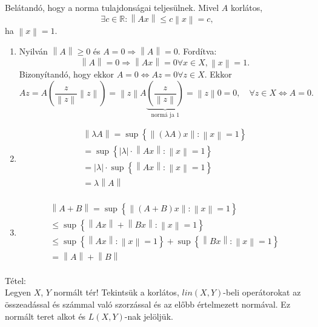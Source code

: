 \documentclass[12pt,a4paper]{scrartcl}
\providecommand{\tightlist}{%
  \setlength{\itemsep}{0pt}\setlength{\parskip}{0pt}}
\newenvironment{tetel}{}{}
\begin{document}
Belátandó, hogy a norma tulajdonságai teljesülnek. Mivel \(A\) korlátos,
\[\exists c \in {\mathbb{R}}:\left\| {Ax} \right\| \leq c\left\| x \right\| = c,\]
ha \(\left\| x \right\| = 1\).

\begin{enumerate}
\def\labelenumi{\arabic{enumi}.}
\tightlist
\item
  Nyilván \(\left\| A \right\| \geq 0\) és
  \(\left. A = 0\Rightarrow\left\| A \right\| = 0 \right.\). Fordítva:
  \[\left. \left\| A \right\| = 0\Rightarrow\left\| {Ax} \right\| = 0\forall x \in X,\left\| x \right\| = 1. \right.\]
  Bizonyítandó, hogy ekkor
  \(\left. A = 0\Leftrightarrow Az = 0\forall z \in X \right.\). Ekkor
  \[Az = A\left( {\frac{z}{{\left\| z \right\|}}\left\| z \right\|} \right) = \left\| z \right\|A\underbrace {\left( {\frac{z}{{\left\| z \right\|}}} \right)}_{{\text{norm\'a ja }}1} = \left\| z \right\|0 = 0,\quad \forall z \in X \Leftrightarrow A = 0.\]
\item
  \[\begin{array}{l}
  {\left\| {\lambda A} \right\| = \sup\left\{ {\left\| {\left( {\lambda A} \right)x} \right\|:\left\| x \right\| = 1} \right\}} \\
  {= \sup\left\{ {\left| \lambda \right| \cdot \left\| {Ax} \right\|:\left\| x \right\| = 1} \right\}} \\
  {= \left| \lambda \right| \cdot \sup\left\{ {\left\| {Ax} \right\|:\left\| x \right\| = 1} \right\}} \\
  {= \lambda\left\| A \right\|} \\
  \end{array}\]
\item
  \[\begin{array}{l}
  {\left\| {A + B} \right\| = \sup\left\{ {\left\| {\left( {A + B} \right)x} \right\|:\left\| x \right\| = 1} \right\}} \\
  {\leq \sup\left\{ {\left\| {Ax} \right\| + \left\| {Bx} \right\|:\left\| x \right\| = 1} \right\}} \\
  {\leq \sup\left\{ {\left\| {Ax} \right\|:\left\| x \right\| = 1} \right\} + \sup\left\{ {\left\| {Bx} \right\|:\left\| x \right\| = 1} \right\}} \\
  {= \left\| A \right\| + \left\| B \right\|} \\
  \end{array}\]
\end{enumerate}

\begin{tetel}

Tétel:\\
Legyen \(X\), \(Y\) normált tér! Tekintsük a korlátos,
\({lin}\left( {X,Y} \right)\)-beli operátorokat az összeadással és
számmal való szorzással és az előbb értelmezett normával. Ez normált
teret alkot és \(L\left( {X,Y} \right)\)-nak jelöljük.

\end{tetel}
\end{document}
